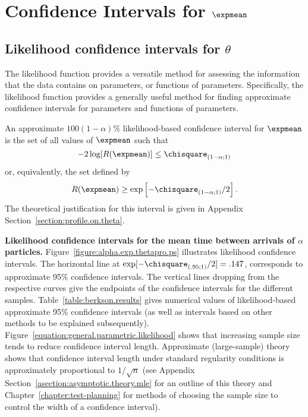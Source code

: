 \section{Confidence Intervals for $\expmean$}
\label{section:one.par.ci.expmean}
\subsection{Likelihood confidence intervals for $\theta$}
\label{section:lr.ci.expmean}
The likelihood function provides a versatile method for assessing the
information that the data contains on parameters, or functions of
parameters.  Specifically, the likelihood function provides a
generally useful method for finding approximate confidence 
intervals for parameters and functions of parameters.

An approximate $100(1-\alpha)\%$ 
likelihood-based confidence interval for $\expmean$
is the set of all values of $\expmean$ such that
\begin{displaymath}
-2 \log[R(\expmean)] \leq \chisquare_{(1-\alpha;1)}
\end{displaymath}
or, equivalently, the set defined by
\begin{displaymath}
R(\expmean) \geq \exp \left [-\chisquare_{(1-\alpha;1)}/2 \right ].
\end{displaymath}
The theoretical justification for this interval is given in
Appendix Section~\ref{section:profile.on.theta}.
\begin{example}
{\bf Likelihood confidence intervals for the mean time between
arrivals of $\alpha$ particles.}
Figure~\ref{figure:alpha.exp.thetapro.ps} illustrates likelihood
confidence intervals.  The horizontal line at
$\exp[-\chisquare_{(.95;1)}/2] = .147$, corresponds to approximate
95\% confidence intervals. The vertical lines dropping from the
respective curves give the endpoints of the confidence intervals for
the different samples.  Table~\ref{table:berkson.results} gives
numerical values of likelihood-based approximate 95\%
confidence intervals (as well as intervals based on other methods to
be explained subsequently).
Figure~\ref{equation:general.parametric.likelihood} shows that
increasing sample size tends to reduce confidence interval
length. Approximate (large-sample) theory shows that confidence
interval length under standard regularity conditions is
approximately proportional to $1/\sqrt{n}$ (see
Appendix Section~\ref{asection:asymptotic.theory.mle} for an outline of this
theory and Chapter~\ref{chapter:test-planning} for methods of
choosing the sample size to control the width of a confidence
interval).
\end{example}

